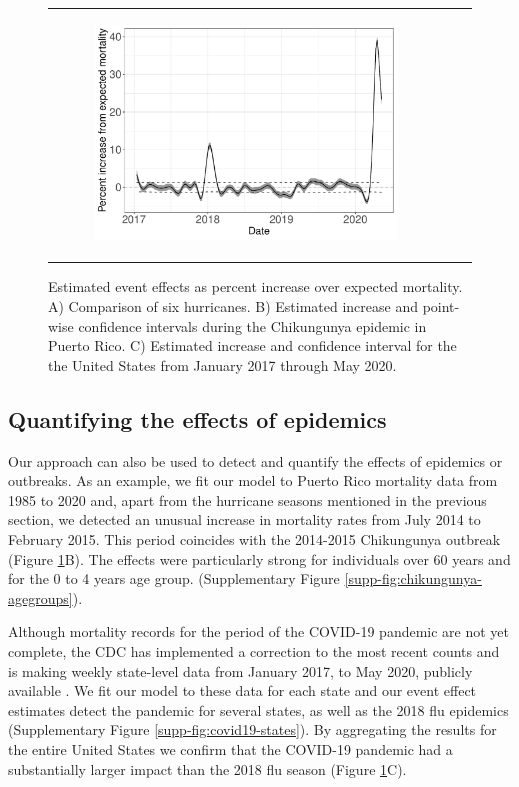 \documentclass[11pt]{article}
\begin{document}
\begin{figure}[ht]
\begin{tabular}{lll}
\begin{subfigure}[t]{0.30\linewidth}
		\includegraphics[width=1\linewidth]{figs/figure-1c.pdf}
	\end{subfigure}\\
    \end{tabular}
    \caption{Estimated event effects as percent increase over expected mortality. A) Comparison of six hurricanes. B) Estimated increase and point-wise confidence intervals  during the Chikungunya epidemic in Puerto Rico. C) Estimated increase and confidence interval for the the United States from January 2017 through May 2020.}
    \label{fig:fhat-estimates}
\end{figure}

\subsection{Quantifying the effects of epidemics}
\label{subsec:epidemics}
Our approach can also be used to detect and quantify the effects of epidemics or outbreaks. As an example, we fit our model to Puerto Rico mortality data from 1985 to 2020 and, apart from the hurricane seasons mentioned in the previous section, we detected an unusual increase in mortality rates from July 2014 to February 2015. This period coincides with the 2014-2015 Chikungunya outbreak \cite{sharp2016surveillance, hsu2019risk}  (Figure \ref{fig:fhat-estimates}B). The effects were particularly strong for individuals over 60 years and for the 0 to 4 years age group. (Supplementary Figure \ref{supp-fig:chikungunya-agegroups}).


Although mortality records for the period of the COVID-19 pandemic are not yet complete, the CDC has implemented a correction to the most recent counts and is making weekly state-level data from January 2017, to May 2020, publicly available \cite{cdc2020covid19}. We fit our model to these data for each state and our event effect estimates detect the pandemic for several states, as well as the 2018 flu epidemics (Supplementary Figure \ref{supp-fig:covid19-states}). By aggregating the results for the entire United States we confirm that the COVID-19 pandemic had a substantially larger impact than the 2018 flu season
(Figure \ref{fig:fhat-estimates}C).
 
\end{document}
